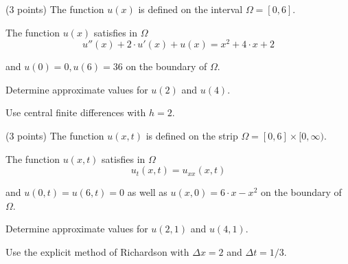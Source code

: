 \begin{teilaufgaben}
\item (3 points)
The function $u(x)$ is defined on the interval $\Omega = [0,6].$ 

\vspace{2mm}

The function $u(x)$ satisfies in $\Omega$ 
\[
u''(x) + 2 \cdot u'(x) + u(x) = x^2 + 4 \cdot x + 2
\]

and  $u(0) = 0, u(6) = 36$ on the boundary of $\Omega$. 

\vspace{2mm}

Determine approximate values for $u(2)$ and $u(4)$. 

\vspace{2mm} Use central finite differences with $h = 2$. 


\item (3 points)
The function $u(x,t)$ is defined on the strip
$\Omega = [0, 6] \times [0,\infty)$.

\vspace{2mm}

The function $u(x,t)$ satisfies in $\Omega$
\[
u_{t}(x,t) = u_{xx}(x,t)
\]

and $u(0,t) = u(6,t) = 0$ as well as $u(x,0) = 6 \cdot x - x^2$ on the boundary of $\Omega$.


Determine approximate values for $u(2,1)$ and $u(4,1)$.

Use the explicit method of Richardson with $\Delta x = 2$ and $\Delta t = 1/3.$

\end{teilaufgaben}



